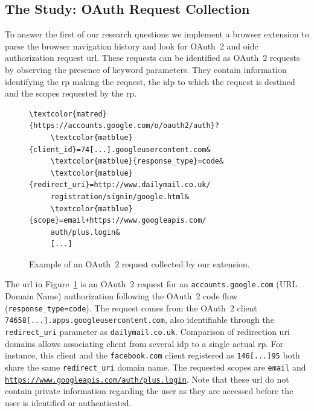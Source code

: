 \subsection{The Study: OAuth Request Collection}
\label{userschooseidp.study}
To answer the first of our research questions we implement a browser extension to parse the browser navigation history and look for OAuth~2 and \gls{oidc} authorization request \gls{url}.
These requests can be identified as OAuth~2 requests by observing the presence of keyword parameters.
They contain information identifying the \gls{rp} making the request, the \gls{idp} to which the request is destined and the scopes requested by the \gls{rp}.

\begin{figure}[H]
\begin{Verbatim}[commandchars=\\\{\}]
\textcolor{matred}{https://accounts.google.com/o/oauth2/auth}?
     \textcolor{matblue}{client_id}=74[...].googleusercontent.com&
     \textcolor{matblue}{response_type}=code&
     \textcolor{matblue}{redirect_uri}=http://www.dailymail.co.uk/
     registration/signin/google.html&
     \textcolor{matblue}{scope}=email+https://www.googleapis.com/
     auth/plus.login&
     [...]
\end{Verbatim}
\caption{Example of an OAuth~2 request collected by our extension.}
\label{fig:oauth2req}
\end{figure}

The \gls{url} in Figure~\ref{fig:oauth2req} is an OAuth~2 request for an \texttt{accounts.google.com} (URL Domain Name) authorization following the OAuth~2 code flow (\texttt{response\_type=code}).
The request comes from the OAuth~2 client \texttt{74658[...].apps.googleusercontent.com}, also identifiable through the \texttt{redirect\_uri} parameter as \texttt{dailymail.co.uk}.
Comparison of redirection \gls{uri} domains allows associating client from several \gls{idp} to a single actual \gls{rp}.
For instance, this client and the \texttt{facebook.com} client registered as \texttt{146[...]95} both share the same \texttt{redirect\_uri} domain name.
The requested scopes are \texttt{email} and \texttt{\url{https://www.googleapis.com/auth/plus.login}}.
Note that these \gls{url} do not contain private information regarding the user as they are accessed before the user is identified or authenticated.


